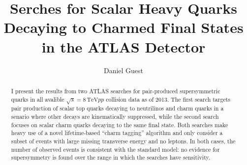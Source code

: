 \documentclass{report}
\title{Serches for Scalar Heavy Quarks Decaying to Charmed Final States in the ATLAS Detector}
\author{Daniel Guest}
\newcommand{\cmenergy}{\ensuremath{\sqrt{s} = 8\,\text{TeV}}\xspace}
\begin{document}
\maketitle
\tableofcontents

\begin{abstract}
I present the results from two ATLAS searches for pair-produced supersymmetric quarks in all avalible \cmenergy $pp$ collision data as of 2013. The first search targets pair production of scalar top quarks decaying to neutrilinos and charm quarks in a senario where other decays are kinematically suppressed, while the second search focuses on scalar charm quarks decaying to the same final state. Both searches make heavy use of a novel lifetime-based ``charm tagging'' algorithm and only consider a subset of events with large missing transverse energy and no leptons. In both cases, the number of observed events is consistent with the standard model: no evidence for supersymmetry is found over the range in which the searches have sensitivity.
\end{abstract}



\end{document}
